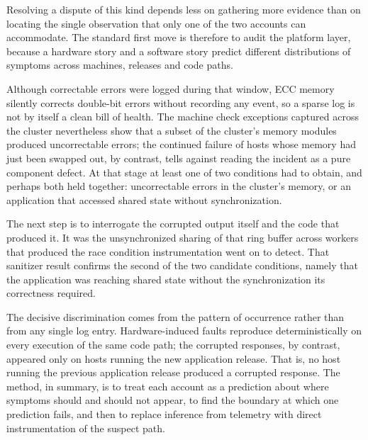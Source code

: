 Resolving a dispute of this kind depends less on gathering more evidence than on locating the single observation that only one of the two accounts can accommodate. The standard first move is therefore to audit the platform layer, because a hardware story and a software story predict different distributions of symptoms across machines, releases and code paths. 

 Although correctable errors were logged during that window, ECC memory silently corrects double-bit errors without recording any event, so a sparse log is not by itself a clean bill of health. The machine check exceptions captured across the cluster nevertheless show that a subset of the cluster's memory modules produced uncorrectable errors; the continued failure of hosts whose memory had just been swapped out, by contrast, tells against reading the incident as a pure component defect. At that stage at least one of two conditions had to obtain, and perhaps both held together: uncorrectable errors in the cluster's memory, or an application that accessed shared state without synchronization.

The next step is to interrogate the corrupted output itself and the code that produced it.  It was the unsynchronized sharing of that ring buffer across workers that produced the race condition instrumentation went on to detect.  That sanitizer result confirms the second of the two candidate conditions, namely that the application was reaching shared state without the synchronization its correctness required.

The decisive discrimination comes from the pattern of occurrence rather than from any single log entry. Hardware-induced faults reproduce deterministically on every execution of the same code path; the corrupted responses, by contrast, appeared only on hosts running the new application release. That is, no host running the previous application release produced a corrupted response. The method, in summary, is to treat each account as a prediction about where symptoms should and should not appear, to find the boundary at which one prediction fails, and then to replace inference from telemetry with direct instrumentation of the suspect path.
